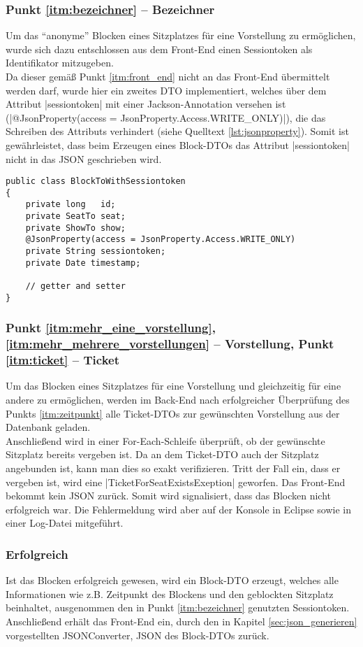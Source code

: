 \subsubsection*{Punkt \ref{itm:bezeichner} -- Bezeichner}
\label{ssssec:Bezeichner}
Um das \enquote{anonyme} Blocken eines Sitzplatzes für eine Vorstellung zu ermöglichen, wurde sich dazu entschlossen aus dem Front-End einen Sessiontoken als Identifikator mitzugeben. \\
Da dieser gemäß Punkt \ref{itm:front_end} nicht an das Front-End übermittelt werden darf, wurde hier ein zweites \acs{DTO} implementiert, welches über dem Attribut \jinline|sessiontoken| mit einer Jackson-Annotation versehen ist (\jinline|@JsonProperty(access = JsonProperty.Access.WRITE_ONLY)|), die das Schreiben des Attributs verhindert (siehe Quelltext \vref{lst:jsonproperty}).
Somit ist gewährleistet, dass beim Erzeugen eines Block-\acs{DTO}s das Attribut \jinline|sessiontoken| nicht in das \acs{JSON} geschrieben wird.

\begin{lstlisting}[style=lstJava, caption={Block-\acs{DTO} mit ausgeblendetem Sessiontoken}, label={lst:jsonproperty}]
public class BlockToWithSessiontoken
{
	private long   id;
	private SeatTo seat;
	private ShowTo show;
	@JsonProperty(access = JsonProperty.Access.WRITE_ONLY)
	private String sessiontoken;
	private Date timestamp;
		
	// getter and setter
}
\end{lstlisting}

\subsubsection*{Punkt \ref{itm:mehr_eine_vorstellung}, \ref{itm:mehr_mehrere_vorstellungen} -- Vorstellung, Punkt \ref{itm:ticket} -- Ticket}
\label{ssssec:Vorstellung}
Um das Blocken eines Sitzplatzes für eine Vorstellung und gleichzeitig für eine andere zu ermöglichen, werden im Back-End nach erfolgreicher Überprüfung des Punkts \ref{itm:zeitpunkt} alle Ticket-\acp{DTO} zur gewünschten Vorstellung aus der Datenbank geladen. \\
Anschließend wird in einer For-Each-Schleife überprüft, ob der gewünschte Sitzplatz bereits vergeben ist.
Da an dem Ticket-\acs{DTO} auch der Sitzplatz angebunden ist, kann man dies so exakt verifizieren.
Tritt der Fall ein, dass er vergeben ist, wird eine \jinline |TicketForSeatExistsExeption| geworfen.
Das Front-End bekommt kein \acs{JSON} zurück.
Somit wird signalisiert, dass das Blocken nicht erfolgreich war.
Die Fehlermeldung wird aber auf der Konsole in Eclipse sowie in einer Log-Datei mitgeführt.

\subsubsection*{Erfolgreich}
\label{ssssec:erfolgreich_blocken}
Ist das Blocken erfolgreich gewesen, wird ein Block-\acs{DTO} erzeugt, welches alle Informationen wie z.B. Zeitpunkt des Blockens und den geblockten Sitzplatz beinhaltet, ausgenommen den in Punkt \ref{itm:bezeichner} genutzten Sessiontoken.
Anschließend erhält das Front-End ein, durch den in Kapitel \vref{sec:json_generieren} vorgestellten JSONConverter, \acs{JSON} des Block-\acp{DTO} zurück.